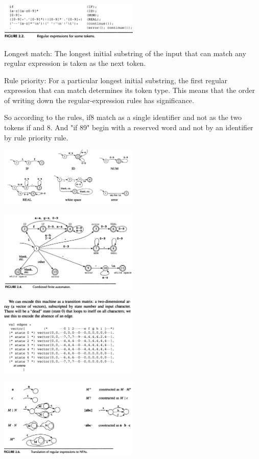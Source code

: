 \documentclass[8pt, a4paper, oneside, twocolumn]{extarticle}
\begin{document}
\includegraphics[width=0.5\textwidth,height=0.5\textheight,keepaspectratio]{reg}

Longest match: The longest initial substring of the input that can match any 
regular expression is taken as the next token. 

Rule priority: For a particular longest initial substring, the first regular  
expression that can match determines its token type. This means that the order of 
writing down the regular-expression rules has significance. 

So according to the rules, if8 match as a single 
identifier and not as the two tokens if and 8. And "if 89" begin with a 
reserved word and not by an identifier by rule priority rule. 

\includegraphics[width=0.5\textwidth,height=0.5\textheight,keepaspectratio]{aut}

\includegraphics[width=0.5\textwidth,height=0.5\textheight,keepaspectratio]{cfa}

\includegraphics[width=0.5\textwidth,height=0.5\textheight,keepaspectratio]{mat}

\includegraphics[width=0.5\textwidth,height=0.5\textheight,keepaspectratio]{rtnfa}
\end{document}
